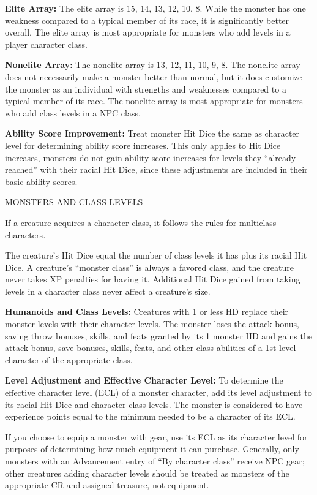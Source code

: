 \documentclass{article}
\begin{document}
\textbf{Elite Array: }The elite array is 15, 14, 13, 12, 10, 8. While the monster 
has one weakness compared to a typical member of its race, it is significantly 
better overall. The elite array is most appropriate for monsters who add levels 
in a player character class.

\textbf{Nonelite Array:} The nonelite array is 13, 12, 11, 10, 9, 8. The nonelite 
array does not necessarily make a monster better than normal, but it does customize 
the monster as an individual with strengths and weaknesses compared to a typical 
member of its race. The nonelite array is most appropriate for monsters who add 
class levels in a NPC class.

\textbf{Ability Score Improvement:} Treat monster Hit Dice the same as character 
level for determining ability score increases. This only applies to Hit Dice increases, 
monsters do not gain ability score increases for levels they ``already reached'' 
with their racial Hit Dice, since these adjustments are included in their basic 
ability scores.

\vspace{12pt}
{\LARGE{}MONSTERS AND CLASS LEVELS}

If a creature acquires a character class, it follows the rules for multiclass characters\textit{.}

The creature's Hit Dice equal the number of class levels it has plus its racial 
Hit Dice. A creature's ``monster class'' is always a favored class, and the creature 
never takes XP penalties for having it. Additional Hit Dice gained from taking 
levels in a character class never affect a creature's size.

\textbf{Humanoids and Class Levels:} Creatures with 1 or less HD replace their 
monster levels with their character levels. The monster loses the attack bonus, 
saving throw bonuses, skills, and feats granted by its 1 monster HD and gains the 
attack bonus, save bonuses, skills, feats, and other class abilities of a 1st-level 
character of the appropriate class.

\textbf{Level Adjustment and Effective Character Level:} To determine the effective 
character level (ECL) of a monster character, add its level adjustment to its racial 
Hit Dice and character class levels. The monster is considered to have experience 
points equal to the minimum needed to be a character of its ECL. 

If you choose to equip a monster with gear, use its ECL as its character level 
for purposes of determining how much equipment it can purchase. Generally, only 
monsters with an Advancement entry of ``By character class'' receive NPC gear; 
other creatures adding character levels should be treated as monsters of the appropriate 
CR and assigned treasure, not equipment.
\end{document}
